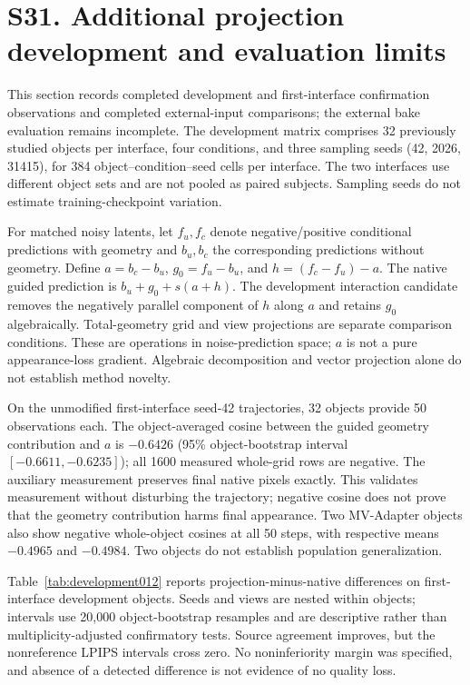 \section*{S31. Additional projection development and evaluation limits}
This section records completed development and first-interface confirmation
observations and completed external-input comparisons; the external bake evaluation remains incomplete. The development matrix comprises 32 previously
studied objects per interface, four conditions, and three sampling seeds
(42, 2026, 31415), for 384 object--condition--seed cells per interface. The two
interfaces use different object sets and are not pooled as paired subjects.
Sampling seeds do not estimate training-checkpoint variation.

For matched noisy latents, let $f_u,f_c$ denote negative/positive conditional
predictions with geometry and $b_u,b_c$ the corresponding predictions without
geometry. Define $a=b_c-b_u$, $g_0=f_u-b_u$, and
$h=(f_c-f_u)-a$. The native guided prediction is $b_u+g_0+s(a+h)$.
The development interaction candidate removes the negatively parallel component
of $h$ along $a$ and retains $g_0$ algebraically. Total-geometry grid and
view projections are separate comparison conditions. These are operations in
noise-prediction space; $a$ is not a pure appearance-loss gradient. Algebraic
decomposition and vector projection alone do not establish method novelty.

On the unmodified first-interface seed-42 trajectories, 32 objects provide
50 observations each. The object-averaged cosine between the guided geometry
contribution and $a$ is $-0.6426$ (95\% object-bootstrap interval
$[-0.6611,-0.6235]$); all 1600 measured whole-grid rows are negative.
The auxiliary measurement preserves final native pixels exactly. This validates
measurement without disturbing the trajectory; negative cosine does not prove
that the geometry contribution harms final appearance. Two MV-Adapter objects
also show negative whole-object cosines at all 50 steps, with respective means
$-0.4965$ and $-0.4984$. Two objects do not establish population generalization.

Table~\ref{tab:development012} reports projection-minus-native differences on
first-interface development objects. Seeds and views are nested within objects;
intervals use 20,000 object-bootstrap resamples and are descriptive rather than
multiplicity-adjusted confirmatory tests. Source agreement improves, but the
nonreference LPIPS intervals cross zero. No noninferiority margin was specified,
and absence of a detected difference is not evidence of no quality loss.

